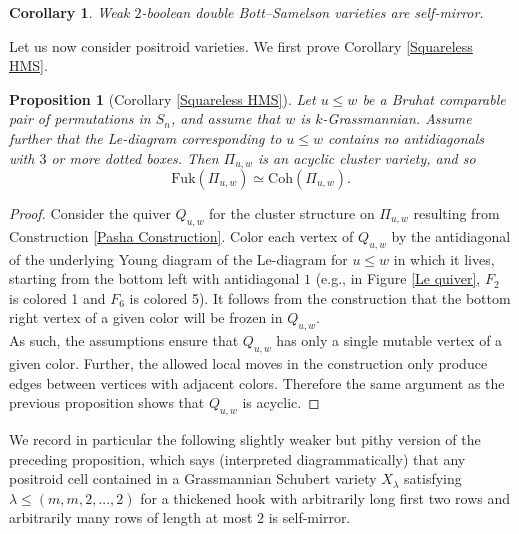 \documentclass[11pt]{amsart}
\newtheorem{cor}[thm]{Corollary}
\newtheorem{prop}[thm]{Proposition}
\theoremstyle{definition}
\theoremstyle{remark}
\newcommand{\Coh}{\mathrm{Coh}}
\newcommand{\Fuk}{\mathrm{Fuk}}
\numberwithin{equation}{section}
\begin{document}
\begin{cor}
    Weak $2$-boolean double Bott--Samelson varieties are self-mirror.
\end{cor}

Let us now consider positroid varieties. We first prove Corollary \ref{Squareless HMS}.

\begin{prop}[Corollary \ref{Squareless HMS}]
    Let $u \leq w$ be a Bruhat comparable pair of permutations in $S_n$, and assume that $w$ is $k$-Grassmannian. Assume further that the Le-diagram corresponding to $u \leq w$ contains no antidiagonals with $3$ or more dotted boxes. Then $\Pi_{u,w}$ is an acyclic cluster variety, and so $$\Fuk(\Pi_{u,w}) \simeq \Coh(\Pi_{u,w}).$$
\end{prop}

\begin{proof}
    Consider the quiver $Q_{u,w}$ for the cluster structure on $\Pi_{u,w}$ resulting from Construction \ref{Pasha Construction}. Color each vertex of $Q_{u,w}$ by the antidiagonal of the underlying Young diagram of the Le-diagram for $u \leq w$ in which it lives, starting from the bottom left with antidiagonal $1$ (e.g., in Figure \ref{Le quiver}, $F_2$ is colored 1 and $F_6$ is colored 5). It follows from the construction that the bottom right vertex of a given color will be frozen in $Q_{u,w}$.\\

    As such, the assumptions ensure that $Q_{u,w}$ has only a single mutable vertex of a given color. Further, the allowed local moves in the construction only produce edges between vertices with adjacent colors. Therefore the same argument as the previous proposition shows that $Q_{u,w}$ is acyclic.
\end{proof}

We record in particular the following slightly weaker but pithy version of the preceding proposition, which says (interpreted diagrammatically) that any positroid cell contained in a Grassmannian Schubert variety $X_\lambda$ satisfying $\lambda \leq (m, m, 2, ..., 2)$ for a thickened hook with arbitrarily long first two rows and arbitrarily many rows of length at most $2$ is self-mirror.
\end{document}
